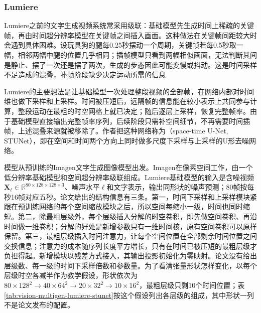 \subsubsection{Lumiere}
\label{sec:vision-multigen-lumiere}

Lumiere之前的文字生成视频系统常采用级联：基础模型先生成时间上稀疏的关键帧，再由时间超分辨率模型在关键帧之间插入画面。这种做法在关键帧间距较大时会遇到具体困难。设玩具狗的腿每0.25秒摆动一个周期，关键帧若每0.5秒取一幅，相邻两幅中腿的位置几乎相同；插帧模型只看到两幅相似画面，无法判断其间是静止、摆了一次还是摆了两次，生成的步态因此可能变慢或抖动。这是时间采样不足造成的混叠，补帧阶段缺少决定运动所需的信息

Lumiere的主要想法是让基础模型一次处理整段视频的全部帧，在网络内部对时间维也做下采样和上采样。时间被压短后，远隔帧的信息能在较小表示上共同参与计算，整段运动在最粗的时空网格上就已决定；随后逐层上采样，恢复完整帧率。由于基础模型直接输出完整帧率序列，后续阶段只需补空间细节，不再需要时间插帧，上述混叠来源就被移除了。作者把这种网络称为（space-time U-Net, STUNet），即在空间和时间两个方向上同时做多尺度下采样与上采样的U形去噪网络。

模型从预训练的Imagen文字生成图像模型出发。Imagen在像素空间工作，由一个低分辨率基础模型和空间超分辨率级联组成。Lumiere基础模型的输入是含噪视频$\bm X_\ell\in\mathbb R^{80\times128\times128\times3}$、噪声水平$\ell$和文字表示，输出同形状的噪声预测；80帧按每秒16帧对应五秒。论文给出的结构信息有三条。第一，时间下采样和上采样模块紧跟在预训练网络的每个空间缩放模块之后，所以空间每缩小一级，时间也同时缩短。第二，除最粗层级外，每个层级插入分解的时空卷积，即先做空间卷积、再沿时间做一维卷积；分解的好处是新增参数只有一维时间核，原有空间卷积可以原样保留。第三，最粗层级插入时间注意力，让每个空间位置在全部剩余时间位置之间交换信息；注意力的成本随序列长度平方增长，只有在时间已被压短的最粗层级才负担得起。新增模块以残差方式接入，其输出投影初始化为零映射。论文没有给出层级数、每一级的时间下采样倍数和参数量。为了看清张量形状怎样变化，以每个层级时空各减半作为教学假设，形状依次为$80\times128^2\to40\times64^2\to20\times32^2\to10\times16^2$，最粗层级只剩10个时间位置；表\ref{tab:vision-multigen-lumiere-stunet}按这个假设列出各层级的组成，其中形状一列不是论文发布的配置。

